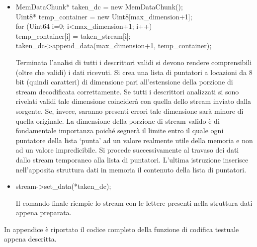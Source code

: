 \begin{itemize}
 \item \begin{code}
MemDataChunk* taken\_dc = new MemDataChunk();\\
Uint8* temp\_container = new Uint8[max\_dimension+1];\\
for (Uint64 i=0; i<max\_dimension+1; i++)\\
	temp\_container[i] = taken\_stream[i];\\
taken\_dc->append\_data(max\_dimension+1, temp\_container);\\
\end{code}
Terminata l'analisi di tutti i descrittori validi si devono rendere
comprensibili (oltre che validi) i dati ricevuti. Si crea una lista di
puntatori a locazioni da 8 bit (quindi caratteri) di dimensione pari
all'estensione della porzione di stream decodificata correttamente. Se tutti i
descrittori analizzati si sono rivelati validi tale dimensione coinciderà con
quella dello stream inviato dalla sorgente. Se, invece, saranno presenti errori tale dimensione sarà minore di quella originale. La dimensione della porzione di stream valido è di fondamentale importanza poiché segnerà il limite entro il quale ogni puntatore della lista `punta' ad un valore realmente utile della memoria e non ad un valore impredicibile. Si procede successivamente al travaso dei dati dallo stream temporaneo alla lista di puntatori. L'ultima istruzione inserisce nell'apposita struttura dati in memoria il contenuto della lista di puntatori.

 \item \begin{code}
stream->set\_data(*taken\_dc);\\
\end{code}
Il comando finale riempie lo stream con le lettere presenti nella struttura dati appena preparata.
\end{itemize}
In appendice è riportato il codice completo della funzione di codifica testuale
appena descritta.

